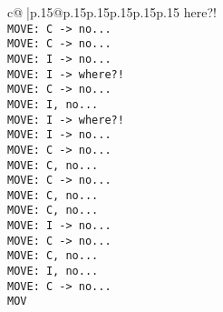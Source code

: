 \documentclass{article}
\begin{document}
{\begin{supertabular}{c@{$\;$}|p{.15\linewidth}@{}p{.15\linewidth}p{.15\linewidth}p{.15\linewidth}p{.15\linewidth}p{.15\linewidth}}
{{{here?!\\ \tt  MOVE: C -> no...\\ \tt  MOVE: C -> no...\\ \tt  MOVE: I -> no...\\ \tt  MOVE: I -> where?!\\ \tt  MOVE: C -> no...\\ \tt  MOVE: I, no...\\ \tt  MOVE: I -> where?!\\ \tt  MOVE: I -> no...\\ \tt  MOVE: C -> no...\\ \tt  MOVE: C, no...\\ \tt  MOVE: C -> no...\\ \tt  MOVE: C, no...\\ \tt  MOVE: C, no...\\ \tt  MOVE: I -> no...\\ \tt  MOVE: C -> no...\\ \tt  MOVE: C, no...\\ \tt  MOVE: I, no...\\ \tt  MOVE: C -> no...\\ \tt  MOV}}}
\end{supertabular}}
\end{document}
